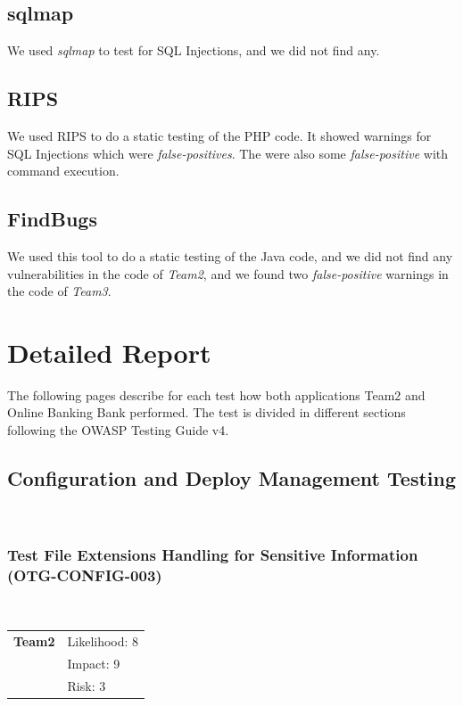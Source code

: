 \documentclass[headsepline,footsepline,footinclude=false,oneside,fontsize=11pt,paper=a4,listof=totoc,bibliography=totoc]{scrbook} %
\begin{document}
\section{sqlmap}
We used \textit{sqlmap} to test for SQL Injections, and we did not find any.
\section{RIPS}
We used RIPS to do a static testing of the PHP code. It showed warnings for SQL Injections which were \textit{false-positives}. The were also some \textit{false-positive} with command execution.
\section{FindBugs}
We used this tool to do a static testing of the Java code, and we did not find any vulnerabilities in the code of \textit{Team2}, and we found two \textit{false-positive} warnings in the code of \textit{Team3}.

\chapter{Detailed Report}

The following pages describe for each test how both applications Team2 and Online Banking Bank
performed. The test is divided in different sections following the OWASP Testing Guide v4.

\pagebreak


\section{Configuration and Deploy Management Testing}\
\subsection{Test File Extensions Handling for Sensitive Information (OTG-CONFIG-003)}\

\begin{tabular}{cR{12cm}}
	\textbf{Team2} & Likelihood: 8\\& Impact: 9\\& Risk: 3
\end{tabular}
\end{document}
